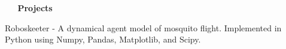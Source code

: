 \documentclass[a4paper,12pt]{article}
\newcommand{\resheading}[1]{{\vspace*{.06in} \colorbox{mygrey}{\begin{minipage}{\textwidth}{\textmd{\large \textbf{#1} \vphantom{p\^{E}}}}\end{minipage}}} }
\newcommand{\ressubheading}[4]{
        \textbf{#1} \hfill #2\\
        \textit{#3} \hfill #4 \\}
\begin{document}
\resheading{~\faCodeFork~ Projects} %

Roboskeeter - A dynamical agent model of mosquito flight. Implemented in Python using Numpy, Pandas, Matplotlib, and Scipy.\\

%
    


\end{document}
